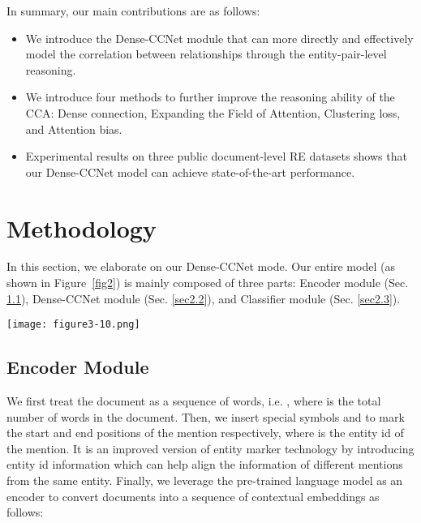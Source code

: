 \documentclass[11pt]{article}
\begin{document}
In summary, our main contributions are as follows:
\begin{itemize}
\item We introduce the Dense-CCNet module that can more directly and effectively model the correlation between relationships through the entity-pair-level reasoning.
\item We introduce four methods to further improve the reasoning ability of the CCA: Dense connection, Expanding the Field of Attention, Clustering loss, and Attention bias.
\item Experimental results on three public document-level RE datasets shows that our Dense-CCNet model can achieve state-of-the-art performance.
\end{itemize}








\section{Methodology}
In this section, we elaborate on our Dense-CCNet mode. Our entire model (as shown in Figure~\ref{fig2}) is mainly composed of three parts: Encoder module (Sec. \ref{sec2.1}), Dense-CCNet module (Sec. \ref{sec2.2}), and Classifier module (Sec. \ref{sec2.3}). 

\begin{figure*}[t]
\centering
\texttt{[image: figure3-10.png]} \caption{The overall architecture of our Dense-CCNet-based document-level RE model. Firstly, the BERT model encodes the input document to obtain the context embedding of each words, and then we obtains the representations of the entities (,) through a pooling operation. Secondly, the relation features () of all entity pairs are calculated through the Relation Feature Calculation module, which is used to construct the original entity-pair matrix (). Thirdly, the Dense-CCNet module transforms  into a context-enhanced entity-pair matrix (). Finally, the context-enhanced relation features () of the entity pairs (, ), the subject entity embedding (), and object entity embedding () are concatenated and inputted to the classifier to predict the relationship.}
\label{fig2}
\end{figure*}







\subsection{Encoder Module}
\label{sec2.1}
We first treat the document  as a sequence of words, i.e. , where  is the total number of words in the document.
Then, we insert special symbols  and  to mark the start and end positions of the mention respectively, where  is the entity id of the mention. 
It is an improved version of entity marker technology \cite{c:112,c:113,c:118,c:103} by introducing entity id information which can help align the information of different mentions from the same entity. 
Finally, we leverage the pre-trained language model as an encoder to convert documents  into a sequence of contextual embeddings as follows:
\end{document}
